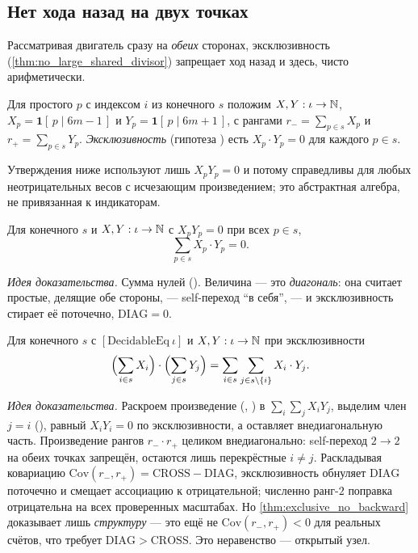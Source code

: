 \subsection{Нет хода назад на двух точках}

Рассматривая двигатель сразу на \emph{обеих} сторонах, эксклюзивность
(\cref{thm:no_large_shared_divisor}) запрещает ход назад и здесь, чисто арифметически.

\begin{definition}\label{def:indicators}
Для простого $p$ с индексом $i$ из конечного $s$ положим $X,Y:\iota\to\mathbb{N}$,
$X_p=\mathbf{1}[\,p\mid 6m-1\,]$ и $Y_p=\mathbf{1}[\,p\mid 6m+1\,]$, с рангами
$r_-=\sum_{p\in s}X_p$ и $r_+=\sum_{p\in s}Y_p$. \emph{Эксклюзивность} (гипотеза ) есть
$X_p\cdot Y_p=0$ для каждого $p\in s$.
\end{definition}

Утверждения ниже используют лишь $X_p Y_p=0$ и потому справедливы для любых неотрицательных весов с
исчезающим произведением; это абстрактная алгебра, не привязанная к индикаторам.

\begin{theorem}\label{thm:exclusive_diag_zero}
\green{} Для конечного $s$ и $X,Y:\iota\to\mathbb{N}$ с $X_p Y_p=0$ при всех $p\in s$,
\begin{equation}\label{eq:diag-zero}
\sum_{p\in s}X_p\cdot Y_p=0.
\end{equation}
\end{theorem}

\emph{Идея доказательства.} Сумма нулей (). Величина --- это
\emph{диагональ}: она считает простые, делящие обе стороны, --- self-переход ``в себя'', --- и
эксклюзивность стирает её поточечно, $\mathrm{DIAG}=0$.

\begin{theorem}\label{thm:exclusive_no_backward}
\green{} Для конечного $s$ с $[\mathrm{DecidableEq}\ \iota]$ и $X,Y:\iota\to\mathbb{N}$ при эксклюзивности
\begin{equation}\label{eq:no-backward}
\Bigl(\sum_{i\in s}X_i\Bigr)\cdot\Bigl(\sum_{j\in s}Y_j\Bigr)=\sum_{i\in s}\sum_{j\in s\setminus\{i\}}X_i\cdot Y_j.
\end{equation}
\end{theorem}

\emph{Идея доказательства.} Раскроем произведение (, )
в $\sum_i\sum_j X_i Y_j$, выделим член $j=i$ (), равный $X_i Y_i=0$ по
эксклюзивности, а  оставляет внедиагональную часть. Произведение рангов
$r_-\cdot r_+$ целиком внедиагонально: self-переход $2\to2$ на обеих точках запрещён, остаются лишь
перекрёстные $i\ne j$. Раскладывая ковариацию
$\mathrm{Cov}(r_-,r_+)=\mathrm{CROSS}-\mathrm{DIAG}$, эксклюзивность обнуляет $\mathrm{DIAG}$
поточечно и смещает ассоциацию к отрицательной; численно ранг-$2$ поправка отрицательна на всех
проверенных масштабах. Но \cref{thm:exclusive_no_backward} доказывает лишь \emph{структуру} --- это
ещё не $\mathrm{Cov}(r_-,r_+)<0$ для реальных счётов, что требует $\mathrm{DIAG}>\mathrm{CROSS}$.
Это неравенство --- открытый узел.

